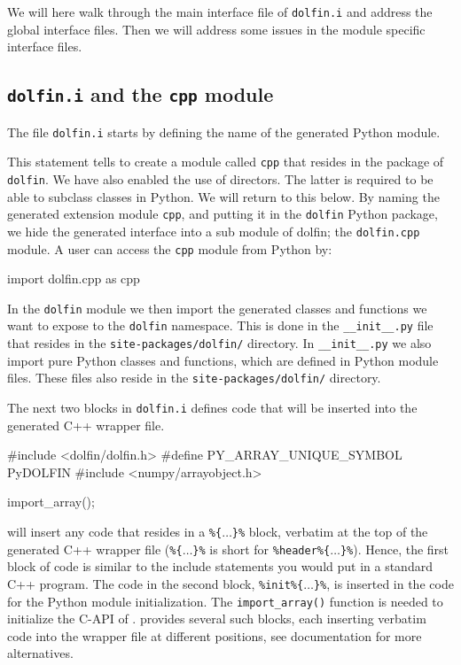 \begin{code}
We will here walk through the main interface file of \texttt{dolfin.i} and address the global interface files. Then we will address some issues in the module specific interface files.\par

\subsection{\texttt{dolfin.i} and the \texttt{cpp} module}
The file \texttt{dolfin.i} starts by defining the name of the generated Python module.
\begin{code}
\end{code}
This statement tells \swig to create a module called \texttt{cpp} that resides in the package of \texttt{dolfin}. We have also enabled the use of directors. The latter is required to be able to subclass \dolfin classes in Python. We will return to this below. By naming the generated extension module \texttt{cpp}, and putting it in the \texttt{dolfin} Python package, we hide the generated interface into a sub module of dolfin; the \texttt{dolfin.cpp} module. A user can access the \texttt{cpp} module from Python by:
\begin{code}
import dolfin.cpp as cpp
\end{code}
In the \texttt{dolfin} module we then import the generated classes and functions we want to expose to the \texttt{dolfin} namespace. This is done in the \texttt{\_\_init\_\_.py} file that resides in the \texttt{site-packages/dolfin/} directory. In \texttt{\_\_init\_\_.py} we also import pure Python classes and functions, which are defined in Python module files. These files also reside in the \texttt{site-packages/dolfin/} directory.\par

The next two blocks in \texttt{dolfin.i} defines code that will be inserted into the \swig generated C++ wrapper file.
\begin{code}
#include <dolfin/dolfin.h>
#define PY_ARRAY_UNIQUE_SYMBOL PyDOLFIN
#include <numpy/arrayobject.h>

import_array();
\end{code}
\swig will insert any code that resides in a \texttt{\%\{$\ldots$\}\%} block, verbatim at the top of the generated C++ wrapper file (\texttt{\%\{$\ldots$\}\%} is short for \texttt{\%header\%\{$\ldots$\}\%}). 
Hence, the first block of code is similar to the include statements you would put in a standard C++ program.  
The code in the second block, \texttt{\%init\%\{$\ldots$\}\%}, is inserted in the code for the Python module initialization. The \texttt{import\_array()} function is needed to initialize the C-API of \numpy. \swig provides several such blocks, each inserting verbatim code into the wrapper file at different positions, see \swig documentation for more alternatives\cite{SWIG}.\par


\end{code}

